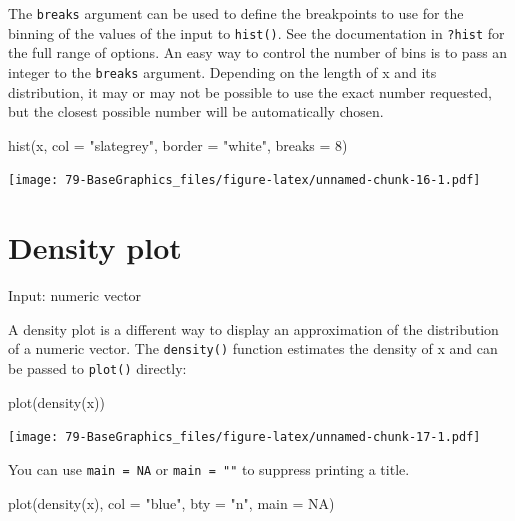 \documentclass[
]{book}
\newenvironment{Shaded}{\begin{snugshade}}{\end{snugshade}}
\newcommand{\AttributeTok}[1]{\textcolor[rgb]{0.77,0.63,0.00}{#1}}
\newcommand{\ConstantTok}[1]{\textcolor[rgb]{0.00,0.00,0.00}{#1}}
\newcommand{\DecValTok}[1]{\textcolor[rgb]{0.00,0.00,0.81}{#1}}
\newcommand{\FunctionTok}[1]{\textcolor[rgb]{0.00,0.00,0.00}{#1}}
\newcommand{\NormalTok}[1]{#1}
\newcommand{\StringTok}[1]{\textcolor[rgb]{0.31,0.60,0.02}{#1}}
\begin{document}
The \texttt{breaks} argument can be used to define the breakpoints to use for the binning of the values of the input to \texttt{hist()}. See the documentation in \texttt{?hist} for the full range of options. An easy way to control the number of bins is to pass an integer to the \texttt{breaks} argument. Depending on the length of x and its distribution, it may or may not be possible to use the exact number requested, but the closest possible number will be automatically chosen.

\begin{Shaded}
\begin{Highlighting}[]
\FunctionTok{hist}\NormalTok{(x, }\AttributeTok{col =} \StringTok{"slategrey"}\NormalTok{, }\AttributeTok{border =} \StringTok{"white"}\NormalTok{,}
     \AttributeTok{breaks =} \DecValTok{8}\NormalTok{)}
\end{Highlighting}
\end{Shaded}

\texttt{[image: 79-BaseGraphics\_files/figure-latex/unnamed-chunk-16-1.pdf]}

\hypertarget{density-plot}{%
\section{Density plot}\label{density-plot}}

Input: numeric vector

A density plot is a different way to display an approximation of the distribution of a numeric vector. The \texttt{density()} function estimates the density of x and can be passed to \texttt{plot()} directly:

\begin{Shaded}
\begin{Highlighting}[]
\FunctionTok{plot}\NormalTok{(}\FunctionTok{density}\NormalTok{(x))}
\end{Highlighting}
\end{Shaded}

\texttt{[image: 79-BaseGraphics\_files/figure-latex/unnamed-chunk-17-1.pdf]}

You can use \texttt{main\ =\ NA} or \texttt{main\ =\ ""} to suppress printing a title.

\begin{Shaded}
\begin{Highlighting}[]
\FunctionTok{plot}\NormalTok{(}\FunctionTok{density}\NormalTok{(x), }\AttributeTok{col =} \StringTok{"blue"}\NormalTok{,}
     \AttributeTok{bty =} \StringTok{"n"}\NormalTok{,}
     \AttributeTok{main =} \ConstantTok{NA}\NormalTok{)}
\end{Highlighting}
\end{Shaded}
\end{document}
